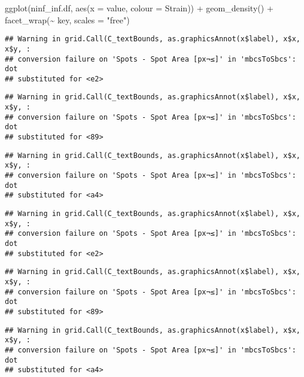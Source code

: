\documentclass[
]{article}
\newenvironment{Shaded}{\begin{snugshade}}{\end{snugshade}}
\newcommand{\AttributeTok}[1]{\textcolor[rgb]{0.77,0.63,0.00}{#1}}
\newcommand{\FunctionTok}[1]{\textcolor[rgb]{0.00,0.00,0.00}{#1}}
\newcommand{\NormalTok}[1]{#1}
\newcommand{\SpecialCharTok}[1]{\textcolor[rgb]{0.00,0.00,0.00}{#1}}
\newcommand{\StringTok}[1]{\textcolor[rgb]{0.31,0.60,0.02}{#1}}
\begin{document}
\begin{Shaded}
\begin{Highlighting}[]
\FunctionTok{ggplot}\NormalTok{(ninf\_inf.df, }\FunctionTok{aes}\NormalTok{(}\AttributeTok{x =}\NormalTok{ value, }\AttributeTok{colour =}\NormalTok{ Strain)) }\SpecialCharTok{+}
  \FunctionTok{geom\_density}\NormalTok{() }\SpecialCharTok{+}
  \FunctionTok{facet\_wrap}\NormalTok{(}\SpecialCharTok{\textasciitilde{}}\NormalTok{ key, }\AttributeTok{scales =} \StringTok{"free"}\NormalTok{) }
\end{Highlighting}
\end{Shaded}

\begin{verbatim}
## Warning in grid.Call(C_textBounds, as.graphicsAnnot(x$label), x$x, x$y, :
## conversion failure on 'Spots - Spot Area [px¬≤]' in 'mbcsToSbcs': dot
## substituted for <e2>
\end{verbatim}

\begin{verbatim}
## Warning in grid.Call(C_textBounds, as.graphicsAnnot(x$label), x$x, x$y, :
## conversion failure on 'Spots - Spot Area [px¬≤]' in 'mbcsToSbcs': dot
## substituted for <89>
\end{verbatim}

\begin{verbatim}
## Warning in grid.Call(C_textBounds, as.graphicsAnnot(x$label), x$x, x$y, :
## conversion failure on 'Spots - Spot Area [px¬≤]' in 'mbcsToSbcs': dot
## substituted for <a4>
\end{verbatim}

\begin{verbatim}
## Warning in grid.Call(C_textBounds, as.graphicsAnnot(x$label), x$x, x$y, :
## conversion failure on 'Spots - Spot Area [px¬≤]' in 'mbcsToSbcs': dot
## substituted for <e2>
\end{verbatim}

\begin{verbatim}
## Warning in grid.Call(C_textBounds, as.graphicsAnnot(x$label), x$x, x$y, :
## conversion failure on 'Spots - Spot Area [px¬≤]' in 'mbcsToSbcs': dot
## substituted for <89>
\end{verbatim}

\begin{verbatim}
## Warning in grid.Call(C_textBounds, as.graphicsAnnot(x$label), x$x, x$y, :
## conversion failure on 'Spots - Spot Area [px¬≤]' in 'mbcsToSbcs': dot
## substituted for <a4>
\end{verbatim}
\end{document}
